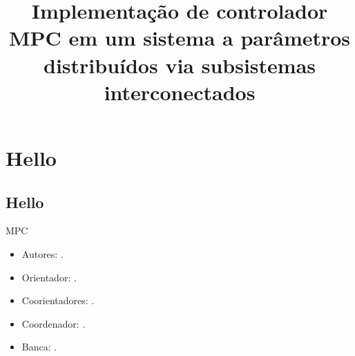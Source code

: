 \documentclass{tcc}
\title{Implementação de controlador MPC em um sistema a parâmetros distribuídos via subsistemas interconectados}
\begin{document}
    \maketitle{}
    
    \toc{}

    \chapter{Hello}%
    \label{chp:hello}

    \section{Hello}%
    \label{sec:hello}

    \ac{MPC}
    
    \begin{itemize}
        \item Autores: \getauthors{}.
        \item Orientador: \getorientador{}.
        \item Coorientadores: \getcoorientadores{}.
        \item Coordenador: \getcoordenador{}.
        \item Banca: .
    \end{itemize}
    
\end{document}
